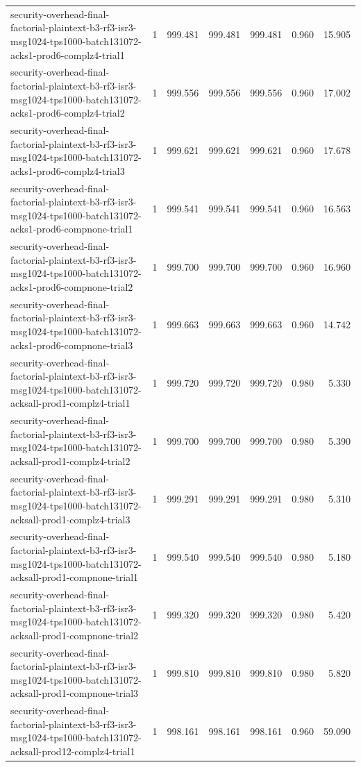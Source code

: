 \begin{tabular}{lrrrrrr}
security-overhead-final-factorial-plaintext-b3-rf3-isr3-msg1024-tps1000-batch131072-acks1-prod6-complz4-trial1 & 1 & 999.481 & 999.481 & 999.481 & 0.960 & 15.905 \\
security-overhead-final-factorial-plaintext-b3-rf3-isr3-msg1024-tps1000-batch131072-acks1-prod6-complz4-trial2 & 1 & 999.556 & 999.556 & 999.556 & 0.960 & 17.002 \\
security-overhead-final-factorial-plaintext-b3-rf3-isr3-msg1024-tps1000-batch131072-acks1-prod6-complz4-trial3 & 1 & 999.621 & 999.621 & 999.621 & 0.960 & 17.678 \\
security-overhead-final-factorial-plaintext-b3-rf3-isr3-msg1024-tps1000-batch131072-acks1-prod6-compnone-trial1 & 1 & 999.541 & 999.541 & 999.541 & 0.960 & 16.563 \\
security-overhead-final-factorial-plaintext-b3-rf3-isr3-msg1024-tps1000-batch131072-acks1-prod6-compnone-trial2 & 1 & 999.700 & 999.700 & 999.700 & 0.960 & 16.960 \\
security-overhead-final-factorial-plaintext-b3-rf3-isr3-msg1024-tps1000-batch131072-acks1-prod6-compnone-trial3 & 1 & 999.663 & 999.663 & 999.663 & 0.960 & 14.742 \\
security-overhead-final-factorial-plaintext-b3-rf3-isr3-msg1024-tps1000-batch131072-acksall-prod1-complz4-trial1 & 1 & 999.720 & 999.720 & 999.720 & 0.980 & 5.330 \\
security-overhead-final-factorial-plaintext-b3-rf3-isr3-msg1024-tps1000-batch131072-acksall-prod1-complz4-trial2 & 1 & 999.700 & 999.700 & 999.700 & 0.980 & 5.390 \\
security-overhead-final-factorial-plaintext-b3-rf3-isr3-msg1024-tps1000-batch131072-acksall-prod1-complz4-trial3 & 1 & 999.291 & 999.291 & 999.291 & 0.980 & 5.310 \\
security-overhead-final-factorial-plaintext-b3-rf3-isr3-msg1024-tps1000-batch131072-acksall-prod1-compnone-trial1 & 1 & 999.540 & 999.540 & 999.540 & 0.980 & 5.180 \\
security-overhead-final-factorial-plaintext-b3-rf3-isr3-msg1024-tps1000-batch131072-acksall-prod1-compnone-trial2 & 1 & 999.320 & 999.320 & 999.320 & 0.980 & 5.420 \\
security-overhead-final-factorial-plaintext-b3-rf3-isr3-msg1024-tps1000-batch131072-acksall-prod1-compnone-trial3 & 1 & 999.810 & 999.810 & 999.810 & 0.980 & 5.820 \\
security-overhead-final-factorial-plaintext-b3-rf3-isr3-msg1024-tps1000-batch131072-acksall-prod12-complz4-trial1 & 1 & 998.161 & 998.161 & 998.161 & 0.960 & 59.090 \\

\end{tabular}
